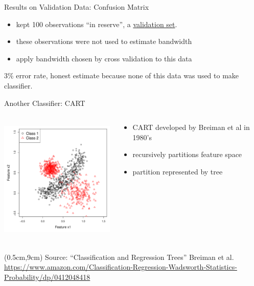 \documentclass[12pt]{beamer}
\newcommand{\att}[1]{\begin{textblock*}{12cm}(0.5cm,9cm) %
  {\tiny Source: #1}
      \end{textblock*}}
\begin{document}
\begin{frame}{Results on Validation Data: Confusion Matrix}

\begin{itemize}
\item kept 100 observations ``in reserve'', a \underline{validation set}.
\item these observations were not used to estimate bandwidth
\item apply bandwidth chosen by cross validation to this data
\end{itemize}
  
\begin{center}

\end{center}

3\% error rate, honest estimate because none of this data was used to make classifier.
  
\end{frame}




\begin{frame}{Another Classifier: CART}
\begin{columns}[T] %

\begin{column}{.5\textwidth}
\includegraphics[height=2.3in,width=2.3in]{figs/training.pdf}
\end{column}
\begin{column}{.5\textwidth}
\begin{itemize}
\item CART developed by Breiman et al in 1980's 
\item recursively partitions feature space
\item partition represented by tree
\end{itemize}
\end{column}


\end{columns}

\att{``Classification and Regression Trees'' Breiman et al. \url{https://www.amazon.com/Classification-Regression-Wadsworth-Statistics-Probability/dp/0412048418}\\}
\end{frame}
\end{document}
